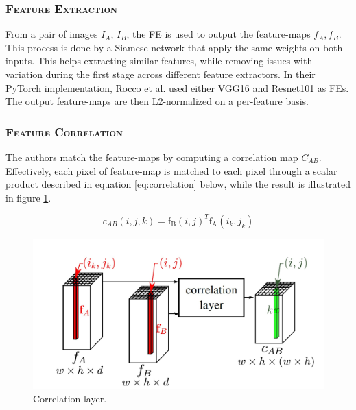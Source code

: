 \documentclass[10pt,conference,compsocconf]{IEEEtran}
\begin{document}
\subsubsection{\textsc{Feature Extraction}}
\label{rocco_fe}
From a pair of images $I_{A}$, $I_{B}$, the FE is used to output the feature-maps $f_{A}, f_{B}$. This process is done by a Siamese network\cite{cartwright_siamese_2021, bertinetto_fully-convolutional_2016} that apply the same weights on both inputs. This helps extracting similar features, while removing issues with variation during the first stage across different feature extractors. In their PyTorch implementation, Rocco et al. used either VGG16\cite{simonyan_very_2015} and Resnet101\cite{he_deep_2015} as FEs. The output feature-maps are then L2-normalized on a per-feature basis.

\subsubsection{\textsc{Feature Correlation}}
\label{rocco_fc}
The authors match the feature-maps by computing a correlation map $C_{AB}$. Effectively, each pixel of feature-map is matched to each pixel through a scalar product described in equation \ref{eq:correlation} below, while the result is illustrated in figure \ref{fig:correlation}. 

\vspace{-.2cm}
\begin{equation}
  \label{eq:correlation}
  c_{AB}(i,j,k) = \mathrm{f_B}(i,j)^T \mathrm{f_A}(i_k,j_k)
\end{equation}

\vspace{-0.3cm}
\begin{figure}[h!]
    \centering
    \includegraphics[scale = 0.42]{correlation_layer_adapted.jpg}
    \vspace{-0.3cm}
    \caption{Correlation layer.}
    \label{fig:correlation}
\end{figure}
\vspace{-0.3cm}
\end{document}
